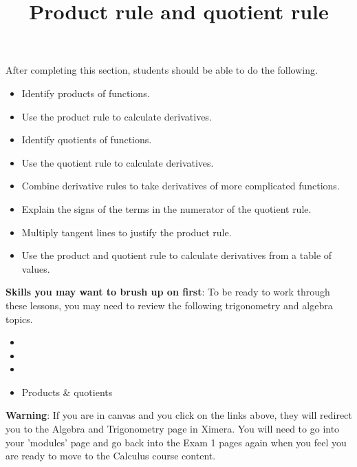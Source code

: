 \documentclass{ximera}
\title{Product rule and quotient rule}
\begin{document}
\begin{abstract}
\end{abstract}

\maketitle

\begin{sectionOutcomes}

After completing this section, students should be able to do the following.

\begin{itemize}
	\item Identify products of functions.
	\item Use the product rule to calculate derivatives.
	\item Identify quotients of functions.
	\item Use the quotient rule to calculate derivatives.
	\item Combine derivative rules to take derivatives of more complicated functions.
        \item Explain the signs of the terms in the numerator of the quotient rule.
        \item Multiply tangent lines to justify the product rule.
	\item Use the product and quotient rule to calculate derivatives from a table of values.
\end{itemize}

\end{sectionOutcomes}

\bigskip

\textbf{Skills you may want to brush up on first}: To be ready to work
through these lessons, you may need to review the following trigonometry and algebra topics.
\begin{itemize}
    \item {}
    \item {}
    \item {}
    \item Products \& quotients
\end{itemize}

\bigskip

\textbf{Warning}: If you are in canvas and you click on the links above, they will redirect you
to the Algebra and Trigonometry page in Ximera. You will need to
go into your 'modules' page and go back into the Exam 1 pages again
when you feel you are ready to move to the Calculus course content.
\end{document}
